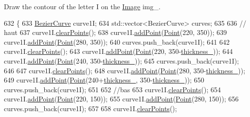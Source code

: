 Draw the contour of the letter I on the \mbox{\hyperlink{class_image}{Image}} img\+\_\+. 


\begin{DoxyCode}
632               \{
633     \mbox{\hyperlink{class_bezier_curve}{BezierCurve}} curve1I;
634     std::vector<BezierCurve> curves;
635 
636     \textcolor{comment}{// haut}
637     curve1I.\mbox{\hyperlink{class_bezier_curve_a0ba8ce66d5af5971ae6a1b506029728e}{clearPoints}}();
638     curve1I.\mbox{\hyperlink{class_bezier_curve_a38d16c18b36ae45619b05e26e226cf34}{addPoint}}(\mbox{\hyperlink{class_point}{Point}}(220, 350));
639     curve1I.\mbox{\hyperlink{class_bezier_curve_a38d16c18b36ae45619b05e26e226cf34}{addPoint}}(\mbox{\hyperlink{class_point}{Point}}(280, 350));
640     curves.push\_back(curve1I);
641 
642     curve1I.\mbox{\hyperlink{class_bezier_curve_a0ba8ce66d5af5971ae6a1b506029728e}{clearPoints}}();
643     curve1I.\mbox{\hyperlink{class_bezier_curve_a38d16c18b36ae45619b05e26e226cf34}{addPoint}}(\mbox{\hyperlink{class_point}{Point}}(220, 350-\mbox{\hyperlink{class_font_v1_aed8040e76be9a52833627b92f0fb4e5f}{thickness\_}}));
644     curve1I.\mbox{\hyperlink{class_bezier_curve_a38d16c18b36ae45619b05e26e226cf34}{addPoint}}(\mbox{\hyperlink{class_point}{Point}}(240, 350-\mbox{\hyperlink{class_font_v1_aed8040e76be9a52833627b92f0fb4e5f}{thickness\_}}));
645     curves.push\_back(curve1I);
646 
647     curve1I.\mbox{\hyperlink{class_bezier_curve_a0ba8ce66d5af5971ae6a1b506029728e}{clearPoints}}();
648     curve1I.\mbox{\hyperlink{class_bezier_curve_a38d16c18b36ae45619b05e26e226cf34}{addPoint}}(\mbox{\hyperlink{class_point}{Point}}(280, 350-\mbox{\hyperlink{class_font_v1_aed8040e76be9a52833627b92f0fb4e5f}{thickness\_}}));
649     curve1I.\mbox{\hyperlink{class_bezier_curve_a38d16c18b36ae45619b05e26e226cf34}{addPoint}}(\mbox{\hyperlink{class_point}{Point}}(240+\mbox{\hyperlink{class_font_v1_aed8040e76be9a52833627b92f0fb4e5f}{thickness\_}}, 350-\mbox{\hyperlink{class_font_v1_aed8040e76be9a52833627b92f0fb4e5f}{thickness\_}}));
650     curves.push\_back(curve1I);
651 
652     \textcolor{comment}{//bas}
653     curve1I.\mbox{\hyperlink{class_bezier_curve_a0ba8ce66d5af5971ae6a1b506029728e}{clearPoints}}();
654     curve1I.\mbox{\hyperlink{class_bezier_curve_a38d16c18b36ae45619b05e26e226cf34}{addPoint}}(\mbox{\hyperlink{class_point}{Point}}(220, 150));
655     curve1I.\mbox{\hyperlink{class_bezier_curve_a38d16c18b36ae45619b05e26e226cf34}{addPoint}}(\mbox{\hyperlink{class_point}{Point}}(280, 150));
656     curves.push\_back(curve1I);
657 
658     curve1I.\mbox{\hyperlink{class_bezier_curve_a0ba8ce66d5af5971ae6a1b506029728e}{clearPoints}}();

\end{DoxyCode}
